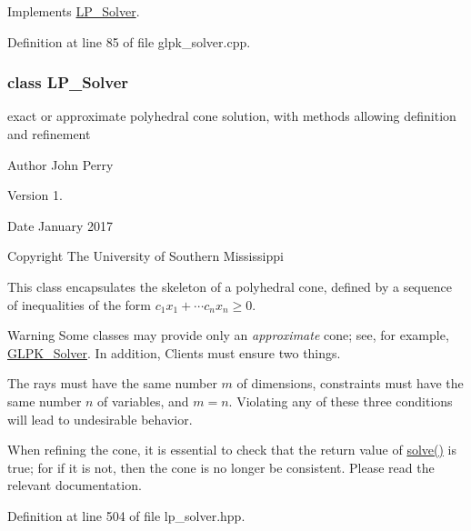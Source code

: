 Implements \hyperlink{group___c_l_s_solvers_a35da4bdf5db971c445f495b6eaab072d}{L\+P\+\_\+\+Solver}.



Definition at line 85 of file glpk\+\_\+solver.\+cpp.

\label{class_l_p___solver}
\subsubsection{class L\+P\+\_\+\+Solver}
exact or approximate polyhedral cone solution, with methods allowing definition and refinement 

\begin{DoxyAuthor}{Author}
John Perry 
\end{DoxyAuthor}
\begin{DoxyVersion}{Version}
1. 
\end{DoxyVersion}
\begin{DoxyDate}{Date}
January 2017 
\end{DoxyDate}
\begin{DoxyCopyright}{Copyright}
The University of Southern Mississippi
\end{DoxyCopyright}
This class encapsulates the skeleton of a polyhedral cone, defined by a sequence of inequalities of the form $ c_1 x_1 + \cdots c_n x_n \geq 0 $.

\begin{DoxyWarning}{Warning}
Some classes may provide only an {\itshape approximate} cone; see, for example, \hyperlink{group___c_l_s_solvers_class_g_l_p_k___solver}{G\+L\+P\+K\+\_\+\+Solver}. In addition, Clients must ensure two things.
\begin{DoxyEnumerate}
\item The rays must have the same number $ m $ of dimensions, constraints must have the same number $ n $ of variables, and $ m=n $. Violating any of these three conditions will lead to undesirable behavior.
\item When refining the cone, it is essential to check that the return value of \hyperlink{group___c_l_s_solvers_abd84374c52124116becc8924dc74e12d}{solve()} is {\ttfamily true}; for if it is not, then the cone is no longer be consistent. Please read the relevant documentation. 
\end{DoxyEnumerate}
\end{DoxyWarning}


Definition at line 504 of file lp\+\_\+solver.\+hpp.

